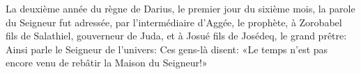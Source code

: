La deuxième année du règne de Darius, le premier jour du sixième mois,
	la parole du Seigneur fut adressée, par l’intermédiaire d’Aggée, le prophète,
	à Zorobabel fils de Salathiel, gouverneur de Juda,
	et à Josué fils de Josédeq, le grand prêtre:
	Ainsi parle le Seigneur de l’univers:
	Ces gens-là disent:
	«Le temps n’est pas encore venu de rebâtir la Maison du Seigneur!»
